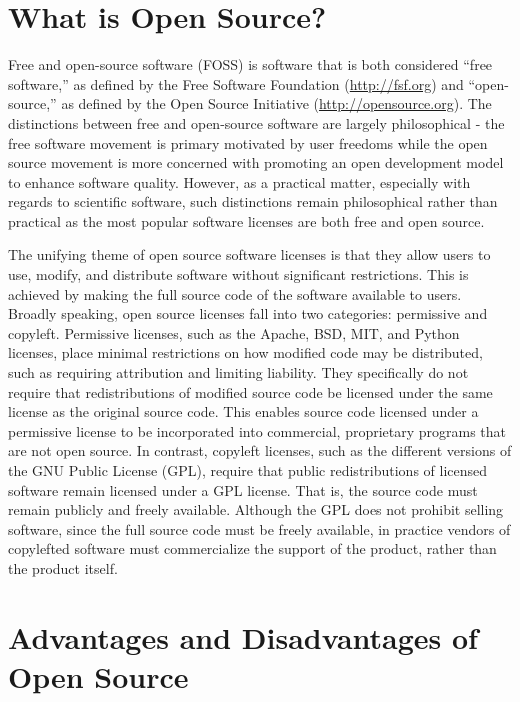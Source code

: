 \section*{What is Open Source?}

Free and open-source software (FOSS) is software that is both considered ``free software,'' as defined by the Free Software Foundation (\url{http://fsf.org}) and ``open-source,'' as defined by the Open Source Initiative (\url{http://opensource.org}).  The distinctions between free and open-source software are largely philosophical  - the free software movement is primary motivated by user freedoms while the open source movement is more concerned with promoting an open development model to enhance software quality.  However, as a practical matter, especially with regards to scientific software, such distinctions remain philosophical rather than practical as the most popular software licenses are both free and open source.  

The unifying theme of open source software licenses is that they allow users to use, modify, and distribute software without significant restrictions.  This is achieved by making the full source code of the software available to users.  Broadly speaking, open source licenses fall into two categories: permissive and copyleft. Permissive licenses, such as the Apache, BSD, MIT, and Python licenses, place minimal restrictions on how modified code may be distributed, such as requiring attribution and limiting liability.  They specifically do not require that redistributions of modified source code be licensed under the same license as the original source code.  This enables source code licensed under a permissive license to be incorporated into commercial, proprietary programs that are not open source.  In contrast, copyleft licenses, such as the different versions of the GNU Public License (GPL), require that public redistributions of licensed software remain licensed under a GPL license.  That is, the source code must remain publicly and freely available. Although the GPL does not prohibit selling software, since the full source code must be freely available, in practice vendors of copylefted software must commercialize the support of the product, rather than the product itself.


\section*{Advantages and Disadvantages of Open Source}


